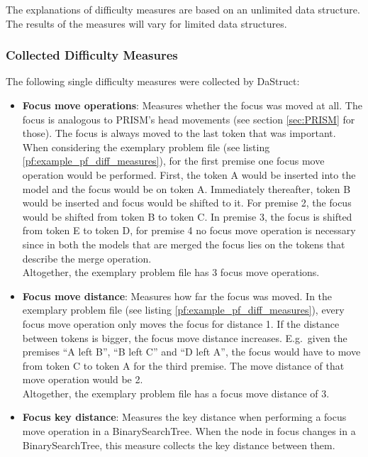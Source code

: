 \documentclass[hidelinks]{scrartcl}
\begin{document}
The explanations of difficulty measures are based on an unlimited data structure. The results of the measures will vary for limited data structures.

\subsubsection{Collected Difficulty Measures}
The following single difficulty measures were collected by DaStruct:

\begin{itemize}
	\item \textbf{Focus move operations}: Measures whether the focus was moved at all. The focus is 		analogous to PRISM's head movements (see section \ref{sec:PRISM} for those). The focus is always 		moved to the last \gls{token} that was important. When considering the exemplary problem file (see listing \ref{pf:example_pf_diff_measures}), for the first premise one focus move operation would be performed. First, the \gls{token} A would be inserted into the model and the focus would be on \gls{token} A. Immediately thereafter, \gls{token} B would be inserted and focus would be shifted to it. For premise 2, the focus would be shifted from \gls{token} B to \gls{token} C. In premise 3, the focus is shifted from \gls{token} E to \gls{token} D, for premise 4 no focus move operation is necessary since in both the models that are merged the focus lies on the \gls{token}s that describe the merge operation.\\
	Altogether, the exemplary problem file has 3 focus move operations.
	\item \textbf{Focus move distance}: Measures how far the focus was moved. In the exemplary problem file (see listing \ref{pf:example_pf_diff_measures}), every focus move operation only moves the focus for distance 1. If the distance between \gls{token}s is bigger, the focus move distance increases. E.g.\ given the \gls{premise}s ``A left B'', ``B left C'' and ``D left A'', the focus would have to move from \gls{token} C to \gls{token} A for the third premise. The move distance of that move operation would be 2.\\
	Altogether, the exemplary problem file has a focus move distance of 3.
	\item \textbf{Focus key distance}: Measures the key distance when performing a focus move operation in a BinarySearchTree. When the node in focus changes in a BinarySearchTree, this measure collects the key distance between them. \\

\end{itemize}
\end{document}
